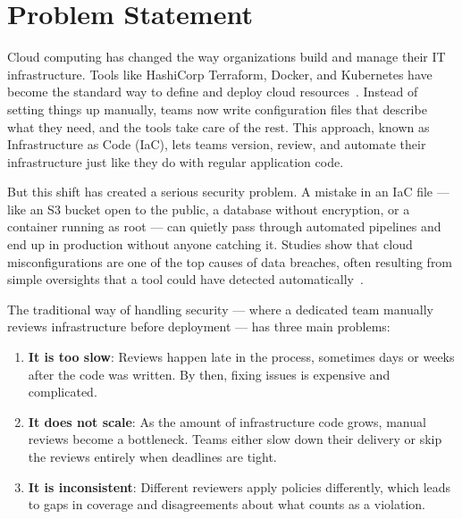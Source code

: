 

\section{Problem Statement}
\label{sec:problem}

Cloud computing has changed the way organizations build and manage their IT infrastructure. Tools like HashiCorp Terraform, Docker, and Kubernetes have become the standard way to define and deploy cloud resources~\cite{morris2020iac}. Instead of setting things up manually, teams now write configuration files that describe what they need, and the tools take care of the rest. This approach, known as Infrastructure as Code (IaC), lets teams version, review, and automate their infrastructure just like they do with regular application code.

But this shift has created a serious security problem. A mistake in an IaC file --- like an S3 bucket open to the public, a database without encryption, or a container running as root --- can quietly pass through automated pipelines and end up in production without anyone catching it. Studies show that cloud misconfigurations are one of the top causes of data breaches, often resulting from simple oversights that a tool could have detected automatically~\cite{aws2024wellarchitected, cis2024benchmarks}.

The traditional way of handling security --- where a dedicated team manually reviews infrastructure before deployment --- has three main problems:

\begin{enumerate}[leftmargin=1.5cm]
  \item \textbf{It is too slow}: Reviews happen late in the process, sometimes days or weeks after the code was written. By then, fixing issues is expensive and complicated.
  
  \item \textbf{It does not scale}: As the amount of infrastructure code grows, manual reviews become a bottleneck. Teams either slow down their delivery or skip the reviews entirely when deadlines are tight.
  
  \item \textbf{It is inconsistent}: Different reviewers apply policies differently, which leads to gaps in coverage and disagreements about what counts as a violation.
\end{enumerate}

